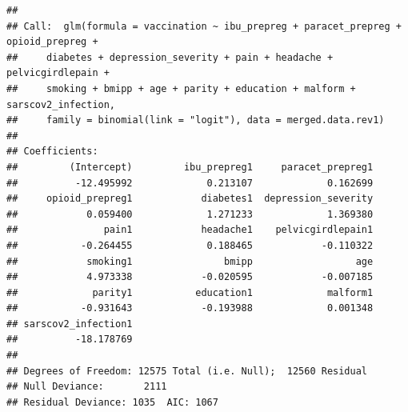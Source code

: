 \documentclass[
]{article}
\begin{document}
\begin{verbatim}
## 
## Call:  glm(formula = vaccination ~ ibu_prepreg + paracet_prepreg + opioid_prepreg + 
##     diabetes + depression_severity + pain + headache + pelvicgirdlepain + 
##     smoking + bmipp + age + parity + education + malform + sarscov2_infection, 
##     family = binomial(link = "logit"), data = merged.data.rev1)
## 
## Coefficients:
##         (Intercept)         ibu_prepreg1     paracet_prepreg1  
##          -12.495992             0.213107             0.162699  
##     opioid_prepreg1            diabetes1  depression_severity  
##            0.059400             1.271233             1.369380  
##               pain1            headache1    pelvicgirdlepain1  
##           -0.264455             0.188465            -0.110322  
##            smoking1                bmipp                  age  
##            4.973338            -0.020595            -0.007185  
##             parity1           education1             malform1  
##           -0.931643            -0.193988             0.001348  
## sarscov2_infection1  
##          -18.178769  
## 
## Degrees of Freedom: 12575 Total (i.e. Null);  12560 Residual
## Null Deviance:       2111 
## Residual Deviance: 1035  AIC: 1067
\end{verbatim}
\end{document}
